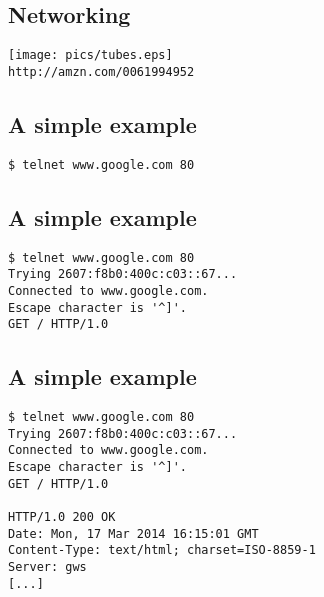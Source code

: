 \documentclass[xga]{xdvislides}
\begin{document}
\subsection{Networking}
\begin{center}
\vspace*{\fill}
	\texttt{[image: pics/tubes.eps]} \\
\vspace*{\fill}
{\tt http://amzn.com/0061994952}
\end{center}





\subsection{A simple example}
\Hugesize
\begin{center}
\begin{verbatim}
$ telnet www.google.com 80

\end{verbatim}
\end{center}
\Normalsize
\vspace*{\fill}

\subsection{A simple example}
\Hugesize
\begin{center}
\begin{verbatim}
$ telnet www.google.com 80
Trying 2607:f8b0:400c:c03::67...
Connected to www.google.com.
Escape character is '^]'.
GET / HTTP/1.0

\end{verbatim}
\end{center}
\Normalsize
\vspace*{\fill}

\subsection{A simple example}
\Hugesize
\begin{center}
\begin{verbatim}
$ telnet www.google.com 80
Trying 2607:f8b0:400c:c03::67...
Connected to www.google.com.
Escape character is '^]'.
GET / HTTP/1.0

HTTP/1.0 200 OK
Date: Mon, 17 Mar 2014 16:15:01 GMT
Content-Type: text/html; charset=ISO-8859-1
Server: gws
[...]
\end{verbatim}
\end{center}
\Normalsize
\vspace*{\fill}
\end{document}

